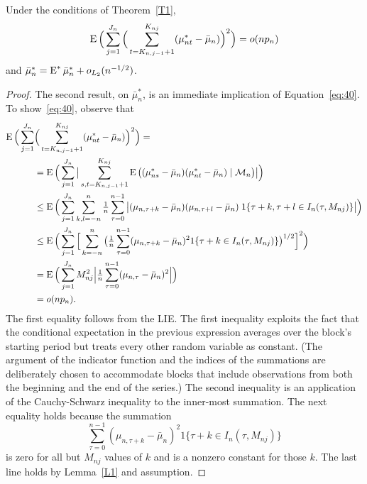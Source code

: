 \documentclass[11pt]{article}
\begin{document}
\begin{lem}\label{L3}
Under the conditions of Theorem~\ref{T1},
\begin{equation}\label{eq:40}
  \operatorname{E} \Big(\sum_{j=1}^{J_n} \Big( \sum_{t = K_{n,j-1}+1}^{K_{nj}}
  (\mu_{nt}^{*} - \bar \mu_n)\Big)^2\Big) = o(n p_n)
\end{equation}
and $\bar \mu_n^{*} = \operatorname{E}^{*} \bar \mu_n^{*} + o_{L_2}(n^{-1/2})$.
\end{lem}
\begin{proof}
  The second result, on $\bar\mu_n^*$, is an immediate implication of
  Equation~\eqref{eq:40}. To show~\eqref{eq:40}, observe that
  \begin{align*}
    \operatorname{E} \Big(\sum_{j=1}^{J_n} &\Big( \sum_{t= K_{n,j-1} +1}^{K_{nj}}
    (\mu_{nt}^{*} - \bar \mu_n)\Big)^2\Big)= \\
    &= \operatorname{E}\Big(\sum_{j=1}^{J_n} \big\lvert \sum_{s,t = K_{n,j-1}+1}^{K_{nj}}
    \operatorname{E} \big((\mu_{ns}^{*} - \bar{\mu}_n)
    (\mu_{nt}^{*} - \bar{\mu}_n) \mid \mathcal{M}_n \big) \big\rvert \Big)\\
    &\leq \operatorname{E}\Big( \sum_{j=1}^{J_n}
    \sum_{k,l = -n}^{n} \tfrac{1}{n} \sum_{\tau=0}^{n-1} \big\lvert
    (\mu_{n,\tau+k} - \bar{\mu}_n) (\mu_{n,\tau+l} - \bar{\mu}_n) \;
    1\{ \tau + k, \tau + l \in I_n(\tau, M_{nj})\} \big\rvert \Big)\\
    &\leq \operatorname{E}\Big(\sum_{j=1}^{J_n} \Big[
    \sum_{k = -n}^{n} \big(\tfrac{1}{n} \sum_{\tau=0}^{n-1}
    (\mu_{n,\tau+k} - \bar{\mu}_n)^2
    1\{ \tau + k \in I_n(\tau, M_{nj})\}\big)^{1/2}\Big]^{2}\Big)\\
    &= \operatorname{E}\Big(\sum_{j=1}^{J_n}
    M_{nj}^2 \Big\lvert \tfrac{1}{n} \sum_{\tau=0}^{n-1}
    (\mu_{n,\tau} - \bar{\mu}_n)^2 \Big\lvert\Big)\\
    &= o(n p_n).
  \end{align*}
  The first equality follows from the LIE\@. The first inequality
  exploits the fact that the conditional expectation in the previous
  expression averages over the block's starting period but treats
  every other random variable as constant. (The argument of the
  indicator function and the indices of the summations are
  deliberately chosen to accommodate blocks that include observations
  from both the beginning and the end of the series.) The second
  inequality is an application of the Cauchy-Schwarz inequality to the
  inner-most summation. The next equality holds because the
  summation
  \[
    \sum_{\tau=0}^{n-1} (\mu_{n,\tau+k} - \bar{\mu}_n)^2
    1\{ \tau + k \in I_n(\tau, M_{nj})\}
  \]
  is zero for all but $M_{nj}$ values of $k$ and is a nonzero constant
  for those $k$. The last line holds by Lemma~\ref{L1} and assumption.
\end{proof}
\end{document}
